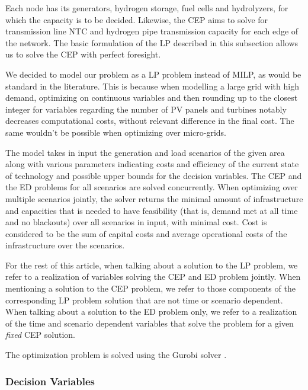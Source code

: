 Each node has its generators, hydrogen storage, fuel cells and hydrolyzers, for which the capacity is to be decided. 
Likewise, the CEP aims to solve for transmission line NTC and hydrogen pipe transmission capacity for each edge of the network. 
The basic formulation of the LP described in this subsection allows us to solve the CEP with perfect foresight. 

We decided to model our problem as a LP problem instead of MILP, as would be standard in the literature. 
This is because when modelling a large grid with high demand, optimizing on continuous variables and then rounding up to the closest integer for variables regarding the number of PV panels and turbines notably decreases computational costs, without relevant difference in the final cost. 
The same wouldn't be possible when optimizing over micro-grids.

The model takes in input the generation and load scenarios of the given area along with various parameters indicating costs and efficiency of the current state of technology and possible upper bounds for the decision variables. 
The CEP and the ED problems for all scenarios are solved concurrently. 
When optimizing over multiple scenarios jointly, the solver returns the minimal amount of infrastructure and capacities that is needed to have feasibility (that is, demand met at all time and no blackouts) over all scenarios in input, with minimal cost. 
Cost is considered to be the sum of capital costs and average operational costs of the infrastructure over the scenarios.

For the rest of this article, when talking about a solution to the LP problem, we refer to a realization of variables solving the CEP and ED problem jointly. 
When mentioning a solution to the CEP problem, we refer to those components of the corresponding LP problem solution that are not time or scenario dependent. 
When talking about a solution to the ED problem only, we refer to a realization of the time and scenario dependent variables that solve the problem for a given \textit{fixed} CEP solution.

The optimization problem is solved using the Gurobi solver \textcolor{green}{\cite{INTRO_gurobi}}.



\subsubsection{Decision Variables}

